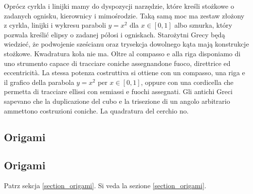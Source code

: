 Oprócz cyrkla i linijki mamy do dyspozycji narzędzie, które kreśli stożkowe o zadanych ognisku, kierownicy i mimośrodzie. %
Taką samą moc ma zestaw złożony z cyrkla, linijki i wykresu paraboli $y = x^2$ dla $x \in [0, 1]$ albo sznurka, który pozwala kreślić elipsy o zadanej półosi i ogniskach. %
Starożytni Grecy będą wiedzieć, że podwojenie sześcianu oraz trysekcja dowolnego kąta mają konstrukcje stożkowe. %
Kwadratura koła nie ma. %
Oltre al compasso e alla riga disponiamo di uno strumento capace di tracciare coniche assegnandone fuoco, direttrice ed eccentricità. %
La stessa potenza costruttiva si ottiene con un compasso, una riga e il grafico della parabola $y=x^2$ per $x \in [0,1]$, oppure con una cordicella che permetta di tracciare ellissi con semiassi e fuochi assegnati. %
Gli antichi Greci sapevano che la duplicazione del cubo e la trisezione di un angolo arbitrario ammettono costruzioni coniche. %
La quadratura del cerchio no. %

\subsection{Origami} %
\subsection{Origami} %

Patrz sekcja \ref{section_origami}. %
Si veda la sezione \ref{section_origami}. %

%